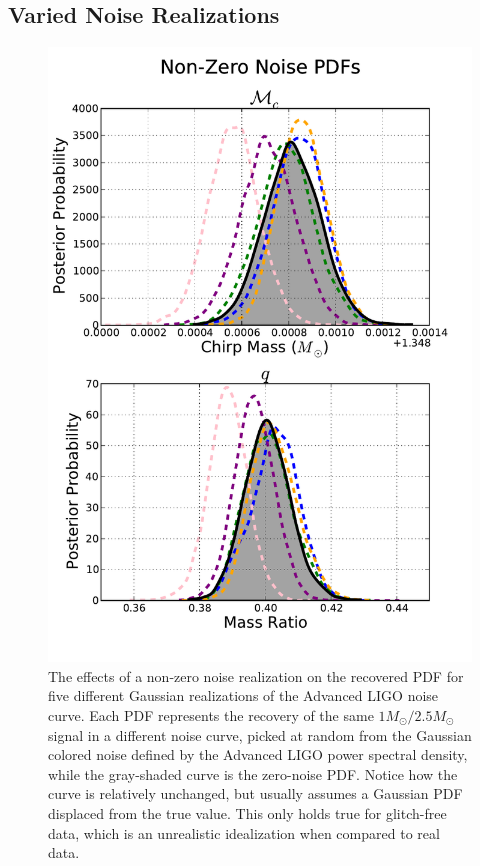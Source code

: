 \documentclass[11pt,a4paper]{emulateapj} 
\begin{document}
\subsection{Varied Noise Realizations}
\label{noiseSection}

\begin{figure}[ht!]
  \centering \includegraphics[trim=0cm 0cm 0cm 0cm,
    clip=true,scale=0.52]{noisePDF.pdf}
 \caption{The effects of a non-zero noise realization on the recovered
   PDF for five different Gaussian realizations of the Advanced LIGO
   noise curve.  Each PDF represents the recovery of the same
   $1M_{\odot}/2.5M_{\odot}$ signal in a different noise curve, picked
   at random from the Gaussian colored noise defined by the Advanced
   LIGO power spectral density, while the gray-shaded curve is the
   zero-noise PDF.  Notice how the curve is relatively unchanged, but
   usually assumes a Gaussian PDF displaced from the true value.  This
   only holds true for glitch-free data, which is an unrealistic
   idealization when compared to real data.}
 \label{noisePDFs}
\end{figure}
  
\end{document}
